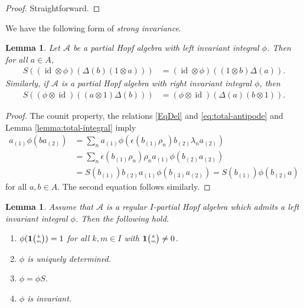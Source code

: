 \documentclass[10pt]{article}
\DeclareMathOperator{\id}{id}
\newcommand{\Grt}[3]{#1{\tiny {\begin{pmatrix} #2\\#3\end{pmatrix}}}}
\newcommand{\UnitC}[2]{\Grt{\mathbf{1}}{#1}{#2}}
\newtheorem{Lem}[Theorem]{Lemma}
\theoremstyle{definition}
\numberwithin{equation}{section}
\begin{document}
\begin{proof}
  Straightforward.
\end{proof}

We have the following form of \emph{strong invariance}.

\begin{Lem} \label{lemma:strong-invariance}
  Let $\mathscr{A}$ be a partial Hopf algebra with left invariant integral $\phi$. Then
  for all $a\in A$,
  \begin{align*}
    S\left(( \id\otimes
    \phi)(\Delta(b)(1 \otimes a))\right) &= (\id \otimes \phi)((1 \otimes b)\Delta(a)).
  \end{align*}
  Similarly, if $\mathscr{A}$ is a partial Hopf algebra with right invariant integral $\phi$, then 
   \begin{align*} S\left((\phi \otimes
    \id)((a\otimes 1)\Delta(b))\right) &= (\phi \otimes \id)(\Delta(a)(b\otimes 1)).\end{align*}
\end{Lem}
\begin{proof}
 The counit property, the relations \eqref{EqDel} and
 \eqref{eq:total-antipode} and Lemma \ref{lemma:total-integral} imply
  \begin{align*}
    a_{(1)}\phi(ba_{(2)}) &= \sum_{n}
    a_{(1)}\phi(\epsilon(b_{(1)}\rho_{n})b_{(2)}\lambda_{n}a_{(2)}) \\
&= \sum_{n} \epsilon(b_{(1)}\rho_{n})\rho_{n}a_{(1)}\phi(b_{(2)}a_{(2)})
\\
&= S(b_{(1)})b_{(2)}a_{(1)}\phi(b_{(3)}a_{(2)}) =
S(b_{(1)})\phi(b_{(2)}a)
  \end{align*}
for all $a,b \in A$. The second equation 
follows similarly.
\end{proof}

\begin{Lem} Assume that $\mathscr{A}$ is a regular  $I$-partial Hopf algebra which admits a left invariant integral $\phi$. Then the following hold.
\begin{enumerate}[label = {(\arabic*)}]
\item\label{LI1} $\phi(\UnitC{k}{m})=1$ for all $k,m\in I$ with $\UnitC{k}{m}\neq 0$.
\item\label{LI2} $\phi$ is uniquely determined.
\item\label{LI3} $\phi=\phi S$.
\item\label{LI4} $\phi$ is invariant.
\end{enumerate}
\end{Lem}
\end{document}
